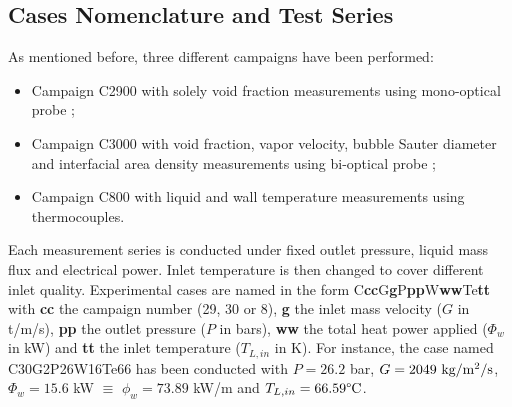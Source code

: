 \subsection{Cases Nomenclature and Test Series}

As mentioned before, three different campaigns have been performed:

\begin{itemize}
\item Campaign C2900 with solely void fraction measurements using mono-optical probe ;

\item Campaign C3000 with void fraction, vapor velocity, bubble Sauter diameter and interfacial area density measurements using bi-optical probe ;

\item Campaign C800 with liquid and wall temperature measurements using thermocouples.
\end{itemize}


Each measurement series is conducted under fixed outlet pressure, liquid mass flux and electrical power. Inlet temperature is then changed to cover different inlet quality. Experimental cases are named in the form C\textbf{cc}G\textbf{g}P\textbf{pp}W\textbf{ww}Te\textbf{tt} with \textbf{cc} the campaign number (29, 30 or 8), \textbf{g} the inlet mass velocity ($G$ in t/m/s), \textbf{pp} the outlet pressure ($P$ in bars), \textbf{ww} the total heat power applied ($\Phi_{w}$ in kW) and \textbf{tt} the inlet temperature ($T_{L,in}$ in K). For instance, the case named C30G2P26W16Te66 has been conducted with $P=26.2$ bar, $G=2049\ \text{kg/m$^{2}$/s}$, $\Phi_{w}=15.6$ kW $\equiv$ $\phi_{w} =73.89$ kW/m and $T_{L,in} = 66.59 \degree\mathrm{C}$.



